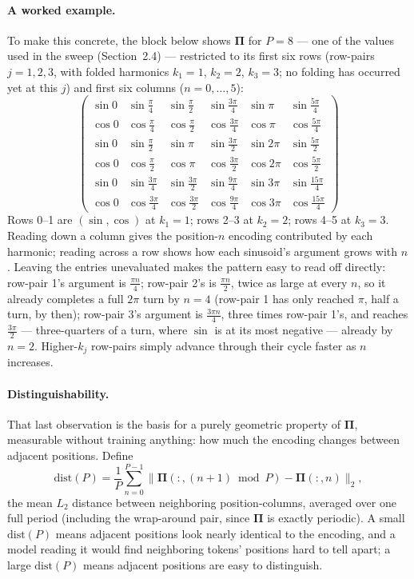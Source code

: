 \documentclass[11pt]{article}
\begin{document}
\paragraph{A worked example.} To make this concrete, the block below shows $\mathbf{\Pi}$ for $P = 8$ --- one of the values used in the sweep (Section~2.4) --- restricted to its first six rows (row-pairs $j = 1, 2, 3$, with folded harmonics $k_1 = 1$, $k_2 = 2$, $k_3 = 3$; no folding has occurred yet at this $j$) and first six columns ($n = 0, \dots, 5$):
\[
\begin{pmatrix}
\sin 0 & \sin\tfrac{\pi}{4} & \sin\tfrac{\pi}{2} & \sin\tfrac{3\pi}{4} & \sin\pi & \sin\tfrac{5\pi}{4} \\
\cos 0 & \cos\tfrac{\pi}{4} & \cos\tfrac{\pi}{2} & \cos\tfrac{3\pi}{4} & \cos\pi & \cos\tfrac{5\pi}{4} \\
\sin 0 & \sin\tfrac{\pi}{2} & \sin\pi & \sin\tfrac{3\pi}{2} & \sin 2\pi & \sin\tfrac{5\pi}{2} \\
\cos 0 & \cos\tfrac{\pi}{2} & \cos\pi & \cos\tfrac{3\pi}{2} & \cos 2\pi & \cos\tfrac{5\pi}{2} \\
\sin 0 & \sin\tfrac{3\pi}{4} & \sin\tfrac{3\pi}{2} & \sin\tfrac{9\pi}{4} & \sin 3\pi & \sin\tfrac{15\pi}{4} \\
\cos 0 & \cos\tfrac{3\pi}{4} & \cos\tfrac{3\pi}{2} & \cos\tfrac{9\pi}{4} & \cos 3\pi & \cos\tfrac{15\pi}{4}
\end{pmatrix}
\]
Rows 0--1 are $(\sin, \cos)$ at $k_1 = 1$; rows 2--3 at $k_2 = 2$; rows 4--5 at $k_3 = 3$. Reading down a column gives the position-$n$ encoding contributed by each harmonic; reading across a row shows how each sinusoid's argument grows with $n$. Leaving the entries unevaluated makes the pattern easy to read off directly: row-pair 1's argument is $\tfrac{\pi n}{4}$; row-pair 2's is $\tfrac{\pi n}{2}$, twice as large at every $n$, so it already completes a full $2\pi$ turn by $n = 4$ (row-pair 1 has only reached $\pi$, half a turn, by then); row-pair 3's argument is $\tfrac{3\pi n}{4}$, three times row-pair 1's, and reaches $\tfrac{3\pi}{2}$ --- three-quarters of a turn, where $\sin$ is at its most negative --- already by $n = 2$. Higher-$k_j$ row-pairs simply advance through their cycle faster as $n$ increases.

\paragraph{Distinguishability.} That last observation is the basis for a purely geometric property of $\mathbf{\Pi}$, measurable without training anything: how much the encoding changes between adjacent positions. Define
\[
  \mathrm{dist}(P) = \frac{1}{P} \sum_{n=0}^{P-1} \big\lVert \mathbf{\Pi}(:, (n+1) \bmod P) - \mathbf{\Pi}(:, n) \big\rVert_2,
\]
the mean $L_2$ distance between neighboring position-columns, averaged over one full period (including the wrap-around pair, since $\mathbf{\Pi}$ is exactly periodic). A small $\mathrm{dist}(P)$ means adjacent positions look nearly identical to the encoding, and a model reading it would find neighboring tokens' positions hard to tell apart; a large $\mathrm{dist}(P)$ means adjacent positions are easy to distinguish.
\end{document}
